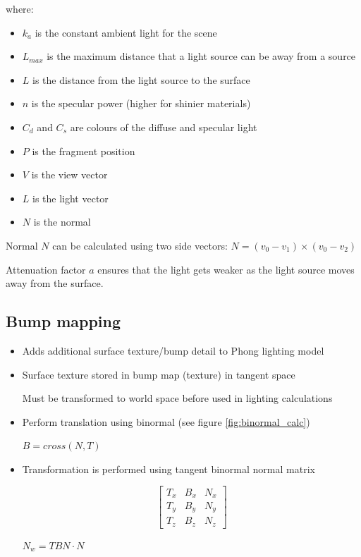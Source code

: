 \documentclass[a4paper]{article}
\begin{document}
where:

\begin{itemize}
  \item
    $k_{a}$ is the constant ambient light for the scene

  \item
    $L_{max}$ is the maximum distance that a light source can be away from a
    source

  \item
    $L$ is the distance from the light source to the surface

  \item
    $n$ is the specular power (higher for shinier materials)

  \item
    $C_{d}$ and $C_{s}$ are colours of the diffuse and specular light

  \item
    $P$ is the fragment position

  \item
    $V$ is the view vector

  \item
    $L$ is the light vector

  \item
    $N$ is the normal

\end{itemize}

Normal $N$ can be calculated using two side vectors: $N = (v_{0} - v_{1}) \times
(v_{0} - v_{2})$

Attenuation factor $a$ ensures that the light gets weaker as the light source
moves away from the surface.

\subsection{Bump mapping}

\begin{itemize}
  \item
    Adds additional surface texture/bump detail to Phong lighting model

  \item
    Surface texture stored in bump map (texture) in tangent space

    Must be transformed to world space before used in lighting calculations

  \item
    Perform translation using binormal (see figure \ref{fig:binormal_calc})

    $B = cross(N, T)$

  \item
    Transformation is performed using tangent binormal normal matrix

    \[
      \left [
        \begin{array}{ccc}
          T_{x} & B_{x} & N_{x} \\
          T_{y} & B_{y} & N_{y} \\
          T_{z} & B_{z} & N_{z}
        \end{array}
      \right ]
    \]

    $N_{w} = TBN \cdot N$

\end{itemize}
\end{document}
